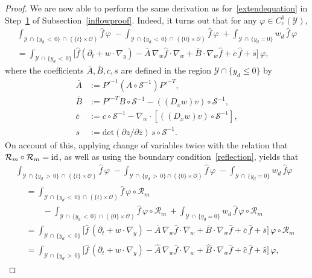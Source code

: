 \documentclass[10pt]{amsart}
\theoremstyle{definition}\newtheorem{defi}[theo]{Definition}\newtheorem{rema}[theo]{Remark}\newtheorem{exam}[theo]{Example}\newtheorem{exem}[theo]{Example}\newtheorem{nota}[theo]{Notation}
\newcommand*\p{\partial}
\renewcommand*\det{\mathrm{det}}
\newcommand*\Rm {\mathcal{R}_m}
\renewcommand*\SS {\mathcal{S}}
\newcommand*\Y {\mathcal{Y}}
\newcommand*\OO {\mathcal{O}}
\begin{document}
\begin{proof}
We are now able to perform the same derivation as for~\eqref{extendequation} in Step~\hyperref[step1]{1} of Subsection~\ref{inflowproof}. Indeed, it turns out that for any $\varphi\in C_c^1(\Y)$,
\begin{multline*}
\int_{\Y\,\cap\,\{y_d\,<\,0\}\,\cap\,(\{t\}\times\OO)} \widehat{f}\, \varphi\; -\int_{\Y\,\cap\,\{y_d\,<\,0\}\,\cap\,(\{0\}\times\OO)} \widehat{f}\, \varphi\; +\int_{\Y\,\cap\,\{y_d=0\}} w_d\,\widehat{f}\, \varphi\\
=\int_{\Y\,\cap\,\{y_d\,<\,0\}} \Big[\widehat{f}(\p_t+w\cdot\nabla_y) -\overline{A}\,\nabla_w\widehat{f}\cdot\nabla_w +\overline{B}\cdot\nabla_w \widehat{f} +\overline{c}\,\widehat{f} +\overline{s} \Big]\,\varphi,
\end{multline*}
where the coefficients $\overline{A},\overline{B},\overline{c},\overline{s}$ are defined in the region $\Y\cap\{y_d\le 0\}$ by
\begin{align*}
\overline{A}&:=P'^{-1}\left(A\circ\SS^{-1}\right) P'^{-T},\\
\overline{B}&:=P'^{-T} B\circ\SS^{-1}\! -((D_xw)v) \circ\SS^{-1},\\
\overline{c}&:=c \circ\SS^{-1}\! - \nabla_w\cdot\left[((D_xw)v) \circ\SS^{-1}\right],\\
\overline{s}&:=\det(\p z/\p \overline{z})\, s \circ\SS^{-1}.
\end{align*}
On account of this, applying change of variables twice with the relation that $\Rm\circ\Rm={\rm id}$, as well as using the boundary condition~\eqref{reflection}, yields that
\begin{multline*}
\int_{\Y\,\cap\,\{y_d\,>\,0\}\,\cap\,(\{t\}\times\OO)} \widehat{f}\, \varphi\; -\int_{\Y\,\cap\,\{y_d\,>\,0\}\cap(\{0\}\times\OO)} \widehat{f}\, \varphi\; -\int_{\Y\,\cap\,\{y_d=0\}} w_d\,\widehat{f} \varphi\\
\begin{aligned}
&=\int_{\Y\,\cap\,\{y_d\,<\,0\}\,\cap\,(\{t\}\times\OO)} \widehat{f}\, \varphi\circ\Rm\\
&\qquad -\int_{\Y\,\cap\,\{y_d\,<\,0\}\,\cap\,(\{0\}\times\OO)} \widehat{f}\, \varphi\circ\Rm\, +\int_{\Y\,\cap\,\{y_d=0\}} w_d\,\widehat{f}\, \varphi\circ\Rm\\
&=\int_{\Y\,\cap\,\{y_d\,<\,0\}} \Big[\widehat{f}\,(\p_t+w\cdot\nabla_y)-\overline{A}\,\nabla_w\widehat{f}\cdot\nabla_w +\overline{B}\cdot\nabla_w \widehat{f} +\overline{c}\,\widehat{f} +\overline{s} \Big]\, \varphi\circ\Rm\\
&=\int_{\Y\,\cap\,\{y_d\,>\,0\}} \Big[\widehat{f}\,(\p_t+w\cdot\nabla_y) -\widehat{A}\,\nabla_w\widehat{f}\cdot\nabla_w +\widehat{B}\cdot\nabla_w \widehat{f} +\widehat{c}\,\widehat{f}+\widehat{s} \Big]\, \varphi,

\end{aligned}
\end{multline*}
\end{proof}
\end{document}
